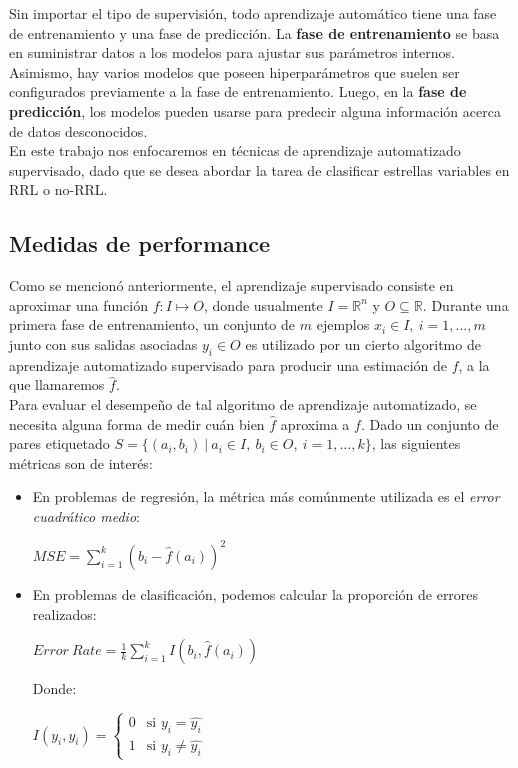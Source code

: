 Sin importar el tipo de supervisión, todo aprendizaje automático tiene una fase de entrenamiento y una fase de predicción. La \textbf{fase de entrenamiento} se basa en suministrar datos a los modelos para ajustar sus parámetros internos. Asimismo, hay varios modelos que poseen hiperparámetros que suelen ser configurados previamente a la fase de entrenamiento.  Luego, en la \textbf{fase de predicción}, los modelos pueden usarse para predecir alguna información acerca de datos desconocidos. \\

En este trabajo nos enfocaremos en técnicas de aprendizaje automatizado supervisado, dado que se desea abordar la tarea de clasificar estrellas variables en RRL o no-RRL. 

\subsection{Medidas de performance}
\label{ml_intro_test}

Como se mencionó anteriormente, el aprendizaje supervisado consiste en aproximar una función $f : I \mapsto O$, donde usualmente $I =\mathds{R}^n$ y $O \subseteq \mathds{R}$. Durante una primera fase de entrenamiento, un conjunto de $m$ ejemplos $x_i \in I, \ i=1,\ldots,m$ junto con sus salidas asociadas $y_i \in O$ es utilizado por un cierto algoritmo de aprendizaje automatizado supervisado para producir una estimación de $f$, a la que llamaremos $\hat{f}$. \\

Para evaluar el desempeño de tal algoritmo de aprendizaje automatizado, se necesita alguna forma de medir cuán bien $\hat{f}$ aproxima a $f$. Dado un conjunto de pares etiquetado $ S = \{ (a_i,b_i) \ | \ a_i \in I, \ b_i \in O, \ i=1,\ldots,k \}$, las siguientes métricas son de interés:

\begin{itemize}

\item  En problemas de regresión, la métrica más comúnmente utilizada es el \textit{error cuadrático medio}:

\begin{center}
$MSE = \sum\limits_{i=1}^{k} ( b_i - \hat{f}(a_i) )^2 $
\end{center}

\item En problemas de clasificación, podemos calcular la proporción de errores realizados:

\begin{center}
$Error \ Rate = \frac{1}{k} \sum\limits_{i=1}^{k} I( b_i , \hat{f}(a_i) ) $
\end{center}

Donde:
\begin{center}
$
I(y_i,\hat{y_i}) =
\left\{
	\begin{array}{ll}
		0  & \mbox{si } y_i = \hat{y_i} \\
		1 & \mbox{si } y_i \neq \hat{y_i}
	\end{array}
\right.
$
\end{center}

\end{itemize}

